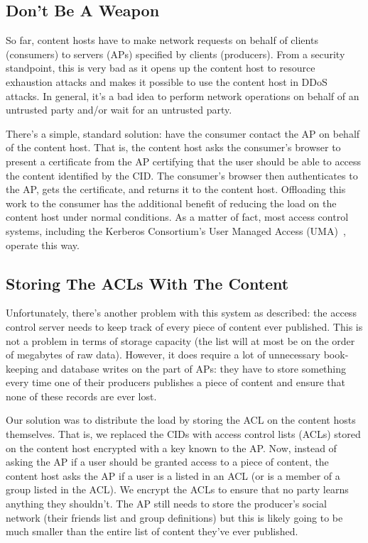 \documentclass[pdftex,12pt,a4papaer,twoside,notitlepage]{report}
\begin{document}
\subsection{Don't Be A Weapon}

So far, content hosts have to make network requests on behalf of clients
(consumers) to servers (APs) specified by clients (producers). From a security
standpoint, this is very bad as it opens up the content host to resource
exhaustion attacks and makes it possible to use the content host in DDoS
attacks. In general, it's a bad idea to perform network operations on behalf of
an untrusted party\cite{dns-amplification} and/or wait for an untrusted
party\cite{slowloris}.

There's a simple, standard solution: have the consumer contact the AP on behalf
of the content host. That is, the content host asks the consumer's browser to
present a certificate from the AP certifying that the user should be able to
access the content identified by the CID. The consumer's browser then
authenticates to the AP, gets the certificate, and returns it to the content
host. Offloading this work to the consumer has the additional benefit of
reducing the load on the content host under normal conditions. As a matter of
fact, most access control systems, including the Kerberos Consortium's User
Managed Access (UMA)~\cite{uma}, operate this way.


\subsection{Storing The ACLs With The Content}

Unfortunately, there's another problem with this system as described: the access
control server needs to keep track of every piece of content ever published.
This is not a problem in terms of storage capacity (the list will at most be on
the order of megabytes of raw data). However, it does require a lot of
unnecessary book-keeping and database writes on the part of APs: they have to
store something every time one of their producers publishes a piece of content
and ensure that none of these records are ever lost.

Our solution was to distribute the load by storing the ACL on the content hosts
themselves. That is, we replaced the CIDs with access control lists (ACLs)
stored on the content host encrypted with a key known to the AP. Now, instead of
asking the AP if a user should be granted access to a piece of content, the
content host asks the AP if a user is a listed in an ACL (or is a member of a
group listed in the ACL). We encrypt the ACLs to ensure that no party learns
anything they shouldn't. The AP still needs to store the producer's social
network (their friends list and group definitions) but this is likely going to
be much smaller than the entire list of content they've ever published.
\end{document}

